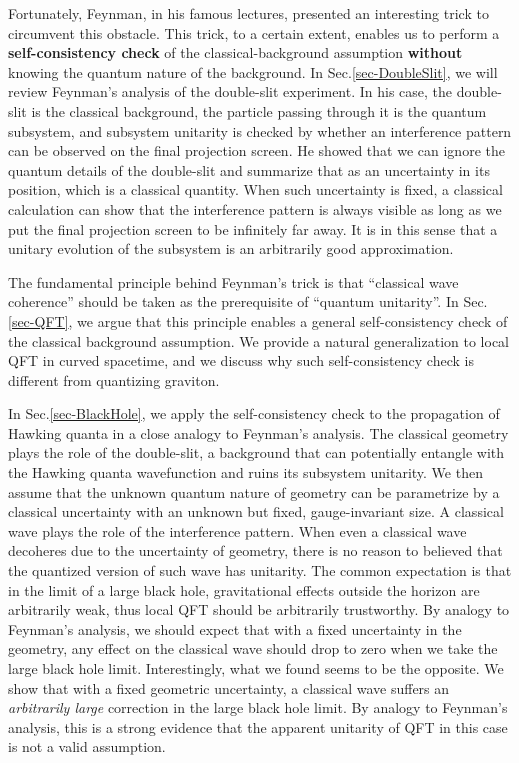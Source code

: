 \documentclass[aps,showpacs,twocolumn,floats,prd,superscriptaddress,nofootinbib]{revtex4-1}
\begin{document}
Fortunately, Feynman, in his famous lectures, presented an interesting trick to circumvent this obstacle. 
This trick, to a certain extent, enables us to perform a {\bf self-consistency check} of the classical-background assumption {\bf without} knowing the quantum nature of the background.
In Sec.\ref{sec-DoubleSlit}, we will review Feynman's analysis of the double-slit experiment. 
In his case, the double-slit is the classical background, the particle passing through it is the quantum subsystem, and subsystem unitarity is checked by whether an interference pattern can be observed on the final projection screen. 
He showed that we can ignore the quantum details of the double-slit and summarize that as an uncertainty in its position, which is a classical quantity. 
When such uncertainty is fixed, a classical calculation can show that the interference pattern is always visible as long as we put the final projection screen to be infinitely far away. 
It is in this sense that a unitary evolution of the subsystem is an arbitrarily good approximation.

The fundamental principle behind Feynman's trick is that ``classical wave coherence'' should be taken as the prerequisite of ``quantum unitarity''. 
In Sec.\ref{sec-QFT}, we argue that this principle enables a general self-consistency check of the classical background assumption. 
We provide a natural generalization to local QFT in curved spacetime, and we discuss why such self-consistency check is different from quantizing graviton.

In Sec.\ref{sec-BlackHole}, we apply the self-consistency check to the propagation of Hawking quanta in a close analogy to Feynman's analysis. 
The classical geometry plays the role of the double-slit, a background that can potentially entangle with the Hawking quanta wavefunction and ruins its subsystem unitarity. 
We then assume that the unknown quantum nature of geometry can be parametrize by a classical uncertainty with an unknown but fixed, gauge-invariant size. 
A classical wave plays the role of the interference pattern. 
When even a classical wave decoheres due to the uncertainty of geometry, there is no reason to believed that the quantized version of such wave has unitarity.
The common expectation is that in the limit of a large black hole, gravitational effects outside the horizon are arbitrarily weak, thus local QFT should be arbitrarily trustworthy.
By analogy to Feynman's analysis, we should expect that with a fixed uncertainty in the geometry, any effect on the classical wave should drop to zero when we take the large black hole limit.
Interestingly, what we found seems to be the opposite. 
We show that with a fixed geometric uncertainty, a classical wave suffers an {\it arbitrarily large} correction in the large black hole limit.
By analogy to Feynman's analysis, this is a strong evidence that the apparent unitarity of QFT in this case is not a valid assumption.
\end{document}
